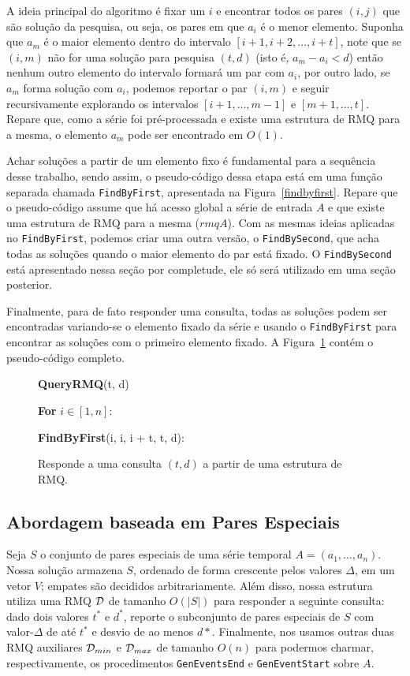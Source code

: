 \documentclass[12pt]{article}
\begin{document}
A ideia principal do algoritmo é fixar um $i$ e encontrar todos os pares $(i, j)$ 
que são solução da pesquisa, ou seja, os pares em que $a_i$ é o menor elemento. 
Suponha que $a_m$ é o maior elemento dentro do intervalo $[i+1, i+2, \ldots, i+t]$, 
note que se $(i, m)$ não for uma solução para pesquisa $(t, d)$ (isto é, $a_m - a_i < d$) então
nenhum outro elemento do intervalo formará um par com $a_i$, por outro lado, se $a_m$  
forma solução com $a_i$, podemos reportar o par $(i, m)$ e seguir recursivamente explorando os intervalos
$[i+1, \ldots, m - 1]$ e $[m + 1, \ldots, t]$. Repare que, como a série foi
pré-processada e existe uma estrutura de RMQ para a mesma, o elemento $a_m$
pode ser encontrado em $O(1)$.

Achar soluções a partir de um elemento fixo é fundamental para a sequência
desse trabalho, sendo assim, o pseudo-código dessa etapa está em uma função separada chamada \verb|FindByFirst|,
apresentada na Figura~\ref{findbyfirst}. Repare que o pseudo-código assume que há acesso global a série
de entrada $A$ e que existe uma estrutura de RMQ para a mesma ($rmqA$). Com as mesmas
ideias aplicadas no \verb|FindByFirst|, podemos criar uma outra versão, o \verb|FindBySecond|, que
acha todas as soluções quando o maior elemento do par está fixado. O \verb|FindBySecond| está apresentado
nessa seção por completude, ele só será utilizado em uma seção posterior.

Finalmente, para de fato responder uma consulta, todas as soluções podem ser encontradas variando-se o 
elemento fixado da série e usando o \verb|FindByFirst| para encontrar as soluções com
o primeiro elemento fixado. A Figura~\ref{queryrmq} contém  o pseudo-código completo.

\begin{figure}
\begin{framed}
{\bf QueryRMQ}(t, d)

\hspace{1cm} {\bf For} $i \in [1, n]$:

\hspace{2cm} {\bf FindByFirst}(i, i, i + t, t, d):
\end{framed}
\label{queryrmq}
\caption{Responde a uma consulta $(t,d)$ a partir de uma estrutura de RMQ.}
\end{figure}


\subsection{Abordagem baseada em Pares Especiais}
Seja $S$ o conjunto de pares especiais de uma série temporal $A = (a_1, \ldots, a_n)$. 
Nossa solução armazena $S$, ordenado de forma crescente pelos valores $\Delta$, em 
um vetor $V$; empates são decididos arbitrariamente. Além disso, nossa estrutura utiliza
uma RMQ ${\cal D}$ de tamanho $O(|S|)$ para responder a seguinte consulta: dado dois valores
$t^*$ e $d^*$, reporte o subconjunto de pares especiais de $S$ com valor-$\Delta$ de até $t^*$ e 
desvio de ao menos $d*$. Finalmente, nos usamos outras duas RMQ auxiliares ${\cal D}_{min}$ e 
${\cal D}_{max}$ de tamanho $O(n)$ para podermos charmar, respectivamente, os procedimentos \verb|GenEventsEnd|
e \verb|GenEventStart| sobre $A$. 
\end{document}
